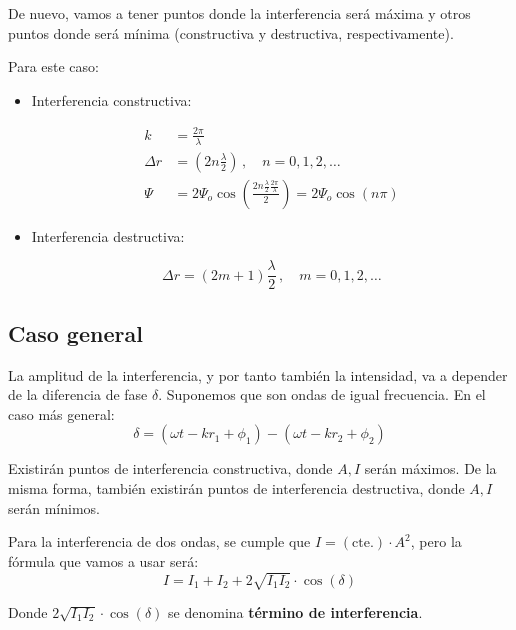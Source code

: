 \documentclass[a4paper]{book}
\begin{document}
De nuevo, vamos a tener puntos donde la interferencia será máxima y otros puntos donde será mínima (constructiva y destructiva, respectivamente).

Para este caso:
\begin{multicols}{2}
	\begin{itemize}
		\item Interferencia constructiva:
		      \begin{fleqn}
			      \begin{align*}
				      k        & =\frac{2\pi}{\lambda}                                                                                          \\
				      \Delta r & = \left( 2n\frac{\lambda}{2} \right) \, , \quad n = 0,1,2, \ldots                                              \\
				      \Psi     & = 2\Psi_o\cos\left( \frac{2n\frac{\lambda}{2}\frac{2\pi}{\lambda}}{2} \right) = 2\Psi_o\cos\left( n\pi \right)
			      \end{align*}
		      \end{fleqn}

		\item Interferencia destructiva:
		      \begin{fleqn}
			      \[\Delta r = \left( 2m+1 \right)\frac{\lambda}{2} \, ,\quad m=0,1,2,\ldots\]
		      \end{fleqn}
	\end{itemize}
\end{multicols}

\subsection{Caso general}

La amplitud de la interferencia, y por tanto también la intensidad, va a depender de la diferencia de fase $\delta$. Suponemos que son ondas de igual frecuencia. En el caso más general:
\[\delta = \left( \omega t - kr_1 + \phi_1 \right) - \left( \omega t - kr_2 + \phi_2 \right)\]

Existirán puntos de interferencia constructiva, donde $A,I$ serán máximos. De la misma forma, también existirán puntos de interferencia destructiva, donde $A,I$ serán mínimos.

Para la interferencia de dos ondas, se cumple que $I=(\text{cte.})\cdot A^2$, pero la fórmula que vamos a usar será:
\[\boxed{I=I_1+I_2+2\sqrt{I_1I_2} \cdot \cos\left( \delta \right)}\]

Donde $2\sqrt{I_1I_2} \cdot \cos\left( \delta \right)$ se denomina \textbf{término de interferencia}.
\end{document}
